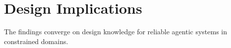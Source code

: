 \documentclass[10pt]{article}
\begin{document}
\section{Design Implications}

The findings converge on design knowledge for reliable agentic
systems in constrained domains.

\end{document}
